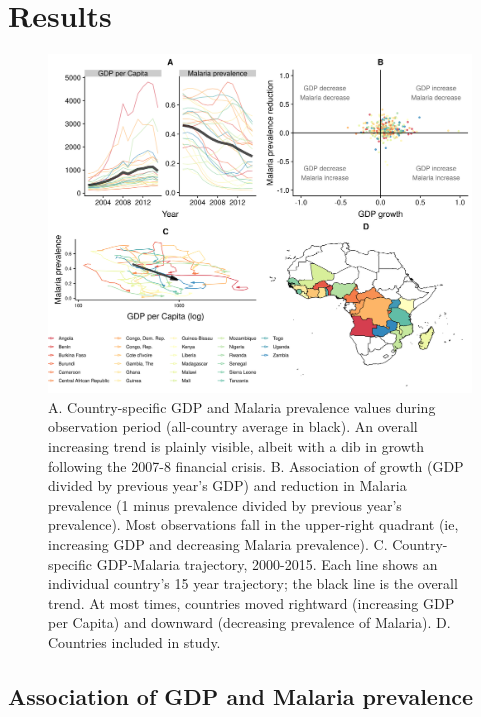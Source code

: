 \documentclass[9pt,twocolumn,twoside,lineno]{pnas-new}
\begin{document}
\section*{Results}

\begin{figure}%
\centering
\includegraphics[width=.9\linewidth]{../figures/descriptive}
\caption{A. Country-specific GDP and Malaria prevalence values during observation period (all-country average in black). An overall increasing trend is plainly visible, albeit with a dib in growth following the 2007-8 financial crisis. B. Association of growth (GDP divided by previous year's GDP) and reduction in Malaria prevalence (1 minus prevalence divided by previous year's prevalence). Most observations fall in the upper-right quadrant (ie, increasing GDP and decreasing Malaria prevalence). C. Country-specific GDP-Malaria trajectory, 2000-2015. Each line shows an individual country's 15 year trajectory; the black line is the overall trend. At most times, countries moved rightward (increasing GDP per Capita) and downward (decreasing prevalence of Malaria). D. Countries included in study.}
\label{fig:descriptive}
\end{figure}


\subsection*{Association of GDP and Malaria prevalence}
\end{document}
